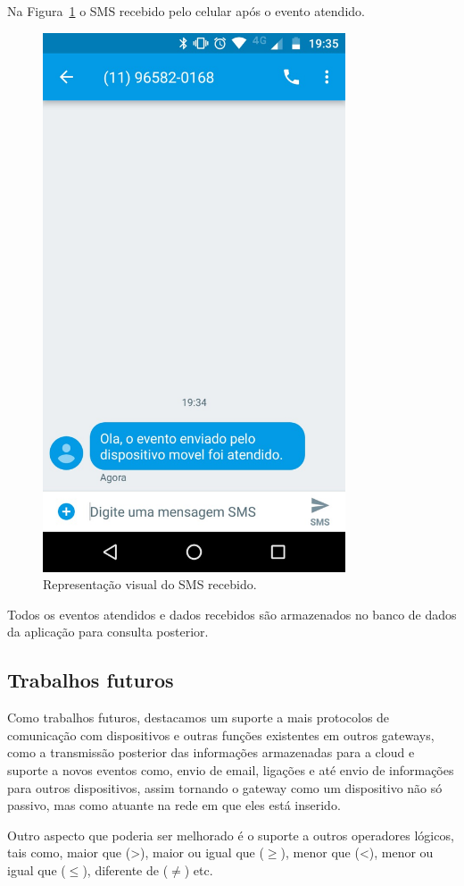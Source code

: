 Na Figura~\ref{fig:smsRecebido2} o SMS recebido pelo celular após o evento atendido.
\begin{figure}[h!]
	\begin{center}
		\includegraphics[width=0.8\textwidth]{./img/smsRecebido2}
		\caption{Representação visual do SMS recebido.}
		\label{fig:smsRecebido2}
	\end{center}
\end{figure}

Todos os eventos atendidos e dados recebidos são armazenados no banco de dados da aplicação para consulta posterior.

\subsection{Trabalhos futuros}
\label{trabalhosFuturos}

Como trabalhos futuros, destacamos um suporte a mais protocolos de comunicação com dispositivos e outras funções existentes em outros gateways, como a transmissão posterior das informações armazenadas para a cloud e suporte a novos eventos como, envio de email, ligações e até envio de informações para outros dispositivos, assim tornando o gateway como um dispositivo não só passivo, mas como atuante na rede em que eles está inserido.


Outro aspecto que poderia ser melhorado é o suporte a outros operadores lógicos, tais como, maior que (>), maior ou igual que (\begin{math} \geq \end{math}), menor que (<), menor ou igual que (\begin{math} \leq \end{math}), diferente de (\begin{math}\ne\end{math}) etc.



